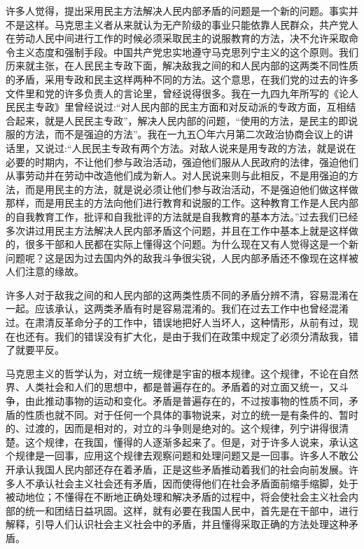 许多人觉得，提出采用民主方法解决人民内部矛盾的问题是一个新的问题。事实并不是这样。马克思主义者从来就认为无产阶级的事业只能依靠人民群众，共产党人在劳动人民中间进行工作的时候必须采取民主的说服教育的方法，决不允许采取命令主义态度和强制手段。中国共产党忠实地遵守马克思列宁主义的这个原则。我们历来就主张，在人民民主专政下面，解决敌我之间的和人民内部的这两类不同性质的矛盾，采用专政和民主这样两种不同的方法。这个意思，在我们党的过去的许多文件里和党的许多负责人的言论里，曾经说得很多。我在一九四九年所写的《论人民民主专政》里曾经说过:“对人民内部的民主方面和对反动派的专政方面，互相结合起来，就是人民民主专政”，解决人民内部的问题，“使用的方法，是民主的即说服的方法，而不是强迫的方法”。我在一九五〇年六月第二次政治协商会议上的讲话里，又说过:“人民民主专政有两个方法。对敌人说来是用专政的方法，就是说在必要的时期内，不让他们参与政治活动，强迫他们服从人民政府的法律，强迫他们从事劳动并在劳动中改造他们成为新人。对人民说来则与此相反，不是用强迫的方法，而是用民主的方法，就是说必须让他们参与政治活动，不是强迫他们做这样做那样，而是用民主的方法向他们进行教育和说服的工作。这种教育工作是人民内部的自我教育工作，批评和自我批评的方法就是自我教育的基本方法。”过去我们已经多次讲过用民主方法解决人民内部矛盾这个问题，并且在工作中基本上就是这样做的，很多干部和人民都在实际上懂得这个问题。为什么现在又有人觉得这是一个新问题呢？这是因为过去国内外的敌我斗争很尖锐，人民内部矛盾还不像现在这样被人们注意的缘故。

许多人对于敌我之间的和人民内部的这两类性质不同的矛盾分辨不清，容易混淆在一起。应该承认，这两类矛盾有时是容易混淆的。我们在过去工作中也曾经混淆过。在肃清反革命分子的工作中，错误地把好人当坏人，这种情形，从前有过，现在也还有。我们的错误没有扩大化，是由于我们在政策中规定了必须分清敌我，错了就要平反。

马克思主义的哲学认为，对立统一规律是宇宙的根本规律。这个规律，不论在自然界、人类社会和人们的思想中，都是普遍存在的。矛盾着的对立面又统一，又斗争，由此推动事物的运动和变化。矛盾是普遍存在的，不过按事物的性质不同，矛盾的性质也就不同。对于任何一个具体的事物说来，对立的统一是有条件的、暂时的、过渡的，因而是相对的，对立的斗争则是绝对的。这个规律，列宁讲得很清楚。这个规律，在我国，懂得的人逐渐多起来了。但是，对于许多人说来，承认这个规律是一回事，应用这个规律去观察问题和处理问题又是一回事。许多人不敢公开承认我国人民内部还存在着矛盾，正是这些矛盾推动着我们的社会向前发展。许多人不承认社会主义社会还有矛盾，因而使得他们在社会矛盾面前缩手缩脚，处于被动地位；不懂得在不断地正确处理和解决矛盾的过程中，将会使社会主义社会内部的统一和团结日益巩固。这样，就有必要在我国人民中，首先是在干部中，进行解释，引导人们认识社会主义社会中的矛盾，并且懂得采取正确的方法处理这种矛盾。

